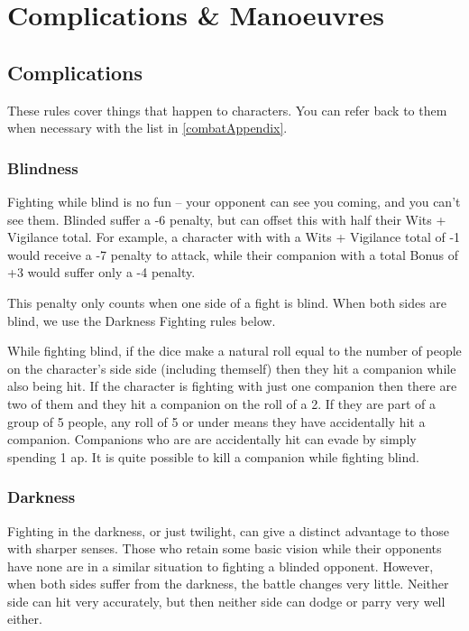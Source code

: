 \section{Complications \& Manoeuvres}

\begin{multicols}{2}

\subsection{Complications}

These rules cover things that happen to characters.
You can refer back to them when necessary with the list in \autoref{combatAppendix}.

\subsubsection[Blindness: Roll at -6 penalty, + (Wits + Vigilance)/ 2]{Blindness}

Fighting while blind is no fun -- your opponent can see you coming, and you can't see them.
Blinded suffer a -6 penalty, but can offset this with half their Wits + Vigilance total.
For example, a character with with a Wits + Vigilance total of -1 would receive a -7 penalty to attack, while their companion with a total Bonus of +3 would suffer only a -4 penalty.

This penalty only counts when one side of a fight is blind. When both sides are blind, we use the Darkness Fighting rules below.

While fighting blind, if the dice make a \gls{natural} roll equal to the number of people on the character's side side (including themself) then they hit a companion while also being hit.
If the character is fighting with just one companion then there are two of them and they hit a companion on the roll of a 2.
If they are part of a group of 5 people, any roll of 5 or under means they have accidentally hit a companion.
Companions who are are accidentally hit can evade by simply spending 1 \gls{ap}.
It is quite possible to kill a companion while fighting blind.

\subsubsection[Darkness: Roll Bonus cannot exceed Wits + Vigilance]{Darkness}
\label{darkness}

Fighting in the darkness, or just twilight, can give a distinct advantage to those with sharper senses.
Those who retain some basic vision while their opponents have none are in a similar situation to fighting a blinded opponent.
However, when both sides suffer from the darkness, the battle changes very little.
Neither side can hit very accurately, but then neither side can dodge or parry very well either.


\end{multicols}
